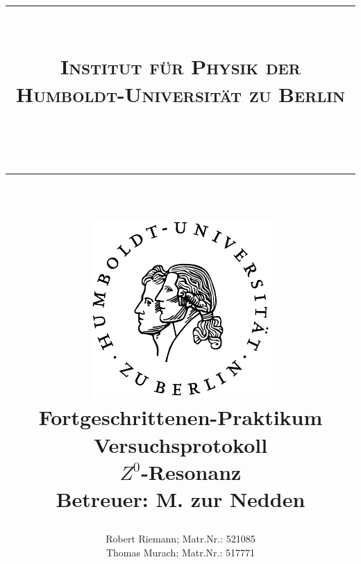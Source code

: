 \documentclass[a4paper,twocolumn,oneside,bibtotoc,smallheadings,tocleft,pointlessnumbers,halfparskip,DIV15]{scrartcl}
\newcommand{\lref}[1]{Listing (\ref{lst:#1})} %
\newcommand{\eref}[1]{Gl. (\ref{eqn:#1})} %
\begin{document}
\title{{\centering \rule{15cm}{0.001cm}\\
\Large{\textsc{Institut für Physik der
Humboldt-Universität zu Berlin}}}\\ \centering \rule{15cm}{0.001cm}\\
\vspace{15mm} \centering
\includegraphics[scale=0.9]{siegel}\\
\vspace{18mm}
{\bf{\huge{Fortgeschrittenen-Praktikum}}}\\
Versuchsprotokoll\\
\vspace{14mm}
$Z^0$-Resonanz\\
\vspace{14mm} {\small{\textbf{Betreuer: M. zur Nedden}}}\\}
\author{Robert Riemann; Matr.Nr.: 521085\\
Thomas Murach; Matr.Nr.: 517771\vspace{18mm}}
\vspace{18mm}
\onecolumn
\maketitle
\twocolumn

\tableofcontents
\listoffigures
\listoftables







% 
% 
% 
\end{document}
